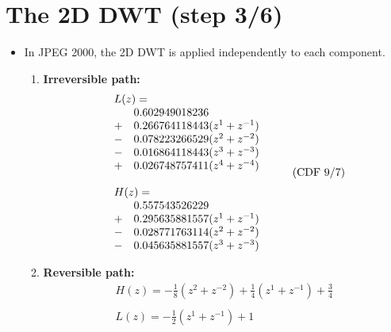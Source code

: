 \section{The 2D DWT (step 3/6)}
\begin{itemize}
\item In JPEG 2000, the 2D DWT is applied independently to each component.
  \begin{enumerate}
  \item \textbf{Irreversible path:}
    \begin{equation}
      \begin{array}{c}
        \begin{array}{ll}
          \multicolumn{2}{l}{L(z) =} \\
          & 0.602949018236\\
          + & 0.266764118443(z^1+z^{-1})\\
          - & 0.078223266529(z^2+z^{-2})\\
          - & 0.016864118443(z^3+z^{-3})\\
          + & 0.026748757411(z^4+z^{-4})
        \end{array}
        \\
        \\
        \begin{array}{ll}
          \multicolumn{2}{l}{H(z) =} \\
          & 0.557543526229\\
          + & 0.295635881557(z^1+z^{-1})\\
          - & 0.028771763114(z^2+z^{-2})\\
          - & 0.045635881557(z^3+z^{-3})
        \end{array}
      \end{array}
      \tag{CDF 9/7}
    \end{equation}
    \newpage
  \item \textbf{Reversible path:}
    \begin{equation}
      \begin{array}{l}
      H(z) = -\frac{1}{8}(z^2+z^{-2}) + \frac{1}{4}(z^1+z^{-1}) +
      \frac{3}{4}\\~\\
      L(z) = -\frac{1}{2}(z^1+z^{-1}) + 1
    \end{array}
    \tag{Spline 5/3}
    \end{equation}
  \end{enumerate}
\end{itemize}

